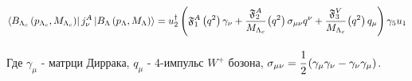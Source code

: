 \begin{equation}
    \bra{B_{\Lambda_c} \left( p_{\Lambda_c}, M_{\Lambda_c} \right)}
    j_\nu^A
    \ket{B_{\Lambda} \left( p_{\Lambda}, M_{\Lambda} \right)} = 
    u_2^\dag \left( \mathfrak F^A_1 \left( q^2 \right) \gamma_\nu + 
    \cfrac{\mathfrak F^A_2}{M_{\Lambda_c}} \left( q^2 \right) \sigma_{\mu\nu} q^\nu + 
    \cfrac{\mathfrak F^V_3}{M_{\Lambda_c}} \left( q^2 \right)q_\mu \right) \gamma_5 u_1 
\end{equation}

Где $\gamma_\mu$ - матрци Диррака, $q_\mu$ - 4-импульс $W^+$ бозона,
$\sigma_{\mu\nu} = \cfrac{1}{2} \left( \gamma_\mu \gamma_\nu - \gamma_\nu \gamma_\mu \right)$.

